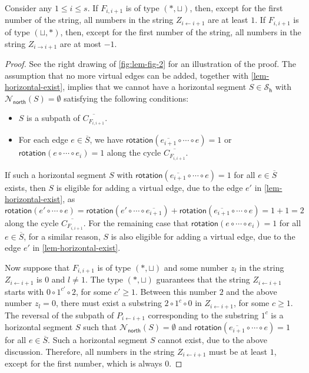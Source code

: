 \documentclass{theoretics}
\newcommand{\PH}{\mathcal{S}_\mathsf{h}}
\newcommand{\Nnorth}{\mathcal{N}_\mathsf{north}}
\newcommand{\rotation}{\mathsf{rotation}}
\begin{document}
\begin{lemma}\label{lem-rotation-calculation}
Consider any $1 \leq i \leq s$.
If $F_{i,i+1}$ is of type $(\ast, \sqcup)$, then, except for the first number of the string, all numbers in the string  $Z_{i \leftarrow i+1}$ are at least $1$.
If $F_{i,i+1}$ is of type $(\sqcup,\ast)$, then, except for the first number of the string, all numbers in the string  $Z_{i \rightarrow i+1}$ are at most $-1$.
\end{lemma}
\begin{proof}
See the right drawing of \cref{fig:lem-fig-2} for an illustration of the proof.
  The assumption that no more virtual edges can be added, 
 together with \cref{lem-horizontal-exist}, implies that we cannot have a horizontal segment $S \in \PH$ 
 with $\Nnorth(S)=\emptyset$ satisfying the following conditions:
 \begin{itemize}
     \item $S$ is a subpath of $\overline{C_{F_{i,i+1}}}$.
     \item For each edge $e \in \overline{S}$, we have $\rotation(\overline{e_{i+1}} \circ \cdots \circ e)=1$  or $\rotation(e \circ \cdots \circ {e_{i}})=1$ along the cycle $\overline{C_{F_{i,i+1}}}$.
 \end{itemize}
 If such a horizontal segment $S$ with 
$\rotation(\overline{e_{i+1}} \circ \cdots \circ e)=1$ for all $e \in \overline{S}$ exists, then $S$ is eligible for adding a virtual edge, due to the edge $e'$ in  \cref{lem-horizontal-exist}, as
\[\rotation(e' \circ \cdots \circ e) 
= \rotation(e' \circ \cdots \circ \overline{e_{i+1}}) + \rotation(\overline{e_{i+1}} \circ \cdots \circ e)
=1+1=2
\]
along the cycle  $\overline{C_{F_{i,i+1}}}$. 
For the remaining case that 
$\rotation(e \circ \cdots \circ {e_{i}})=1$ for all $e \in \overline{S}$,  for a similar reason, $S$ is also eligible for adding a virtual edge, due to the edge $e'$ in  \cref{lem-horizontal-exist}. 


 
  
  Now suppose that $F_{i,i+1}$ is of type $(\ast, \sqcup)$ and some number $z_l$ in the string  $Z_{i \leftarrow i+1}$ is $0$ and $l \neq 1$. The type $(\ast, \sqcup)$ guarantees that the string $Z_{i \leftarrow i+1}$ starts with $0 \circ 1^{c'} \circ 2$, for some $c' \geq 1$. Between this number $2$ and the above number $z_l=0$,  there must exist a substring $2 \circ 1^c \circ 0$ in $Z_{i \leftarrow i+1}$, for some $c \geq 1$. The reversal of the subpath of $P_{i \leftarrow i+1}$ corresponding to the substring $1^c$ is a horizontal segment  $S$ such that $\Nnorth(S)=\emptyset$ and $\rotation(\overline{e_{i+1}} \circ \cdots \circ e)=1$ for all $e \in \overline{S}$. Such a horizontal segment  $S$  cannot exist, due to the above discussion. Therefore,  all numbers in the string  $Z_{i \leftarrow i+1}$ must be at least $1$, except for the first number, which is always $0$.  
  

\end{proof}
\end{document}

